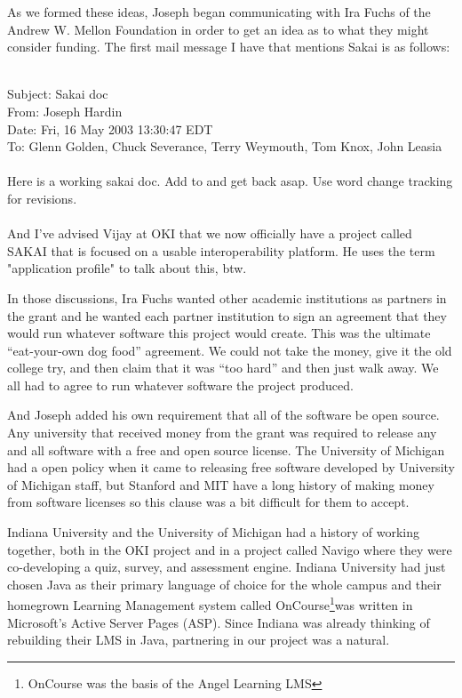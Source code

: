 \documentclass[12pt]{book}
\begin{document}
As we formed these ideas, Joseph began communicating with Ira Fuchs of the Andrew W. Mellon
Foundation in order to get an idea as to what they might consider funding.  The first
mail message I have that mentions Sakai is as follows:\\
\\
\begin{sf}
Subject: Sakai doc\\
From: Joseph Hardin \\
Date: Fri, 16 May 2003 13:30:47 EDT\\
To: Glenn Golden, Chuck Severance, Terry Weymouth,
Tom Knox, John Leasia\\
\\
Here is a working sakai doc.  Add to and get back asap.
Use word change tracking for revisions.\\
\\
And I've advised Vijay at OKI that we now officially have
a project called SAKAI that is focused on a usable
interoperability platform.  He uses the term
"application profile" to talk about this, btw.\\
\end{sf}

In those discussions, Ira Fuchs wanted
other academic institutions as partners in the grant and he wanted each
partner institution to sign an agreement that they would run
whatever software this project would create.  This was the ultimate ``eat-your-own dog food''
agreement.   We could not take the money, give it the old college try, and then claim that
it was ``too hard'' and then just walk away.  We all had to agree to run whatever software
the project produced.

And Joseph added his own requirement that all of the software be open source.  Any university
that received money from the grant was required to release any and all software with a free
and open source license.   The University of Michigan had a open policy when it came
to releasing free software developed by University of Michigan staff,  but Stanford and MIT
have a long history of making money from software licenses so this clause was a bit
difficult for them to accept.

Indiana University and the University of Michigan had a history of working together, both
in the OKI project and in a project called Navigo where they were co-developing a
quiz, survey, and assessment engine.  Indiana University had just chosen Java
as their primary language of choice for the whole campus and their homegrown
Learning Management system called OnCourse\footnote{OnCourse was the basis of
the Angel Learning LMS}was written in Microsoft's Active Server Pages (ASP).  Since Indiana was
already thinking of rebuilding their LMS in Java, partnering in our project was a natural.
\end{document}
